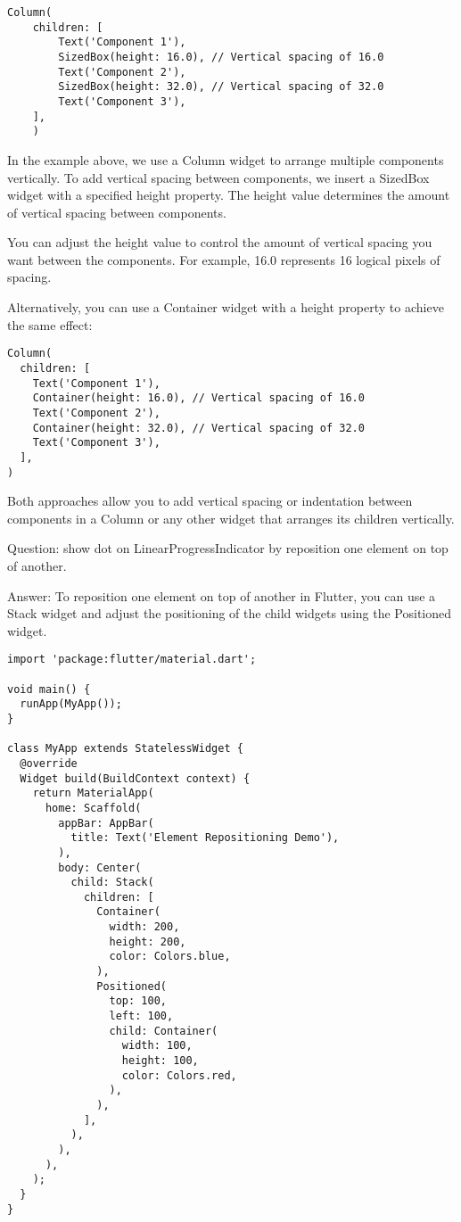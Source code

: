 \begin{lstlisting}
Column(
    children: [
        Text('Component 1'),
        SizedBox(height: 16.0), // Vertical spacing of 16.0
        Text('Component 2'),
        SizedBox(height: 32.0), // Vertical spacing of 32.0
        Text('Component 3'),
    ],
    ) 
\end{lstlisting}

In the example above, we use a Column widget to arrange multiple components vertically. To add vertical spacing 
between components, we insert a SizedBox widget with a specified height property. The height value determines 
the amount of vertical spacing between components.

You can adjust the height value to control the amount of vertical spacing you want between the components. 
For example, 16.0 represents 16 logical pixels of spacing.

Alternatively, you can use a Container widget with a height property to achieve the same effect:

\begin{lstlisting}
Column(
  children: [
    Text('Component 1'),
    Container(height: 16.0), // Vertical spacing of 16.0
    Text('Component 2'),
    Container(height: 32.0), // Vertical spacing of 32.0
    Text('Component 3'),
  ],
)
\end{lstlisting}

Both approaches allow you to add vertical spacing or indentation between components in a Column or any other 
widget that arranges its children vertically.


Question: show dot on LinearProgressIndicator by reposition one element on top of another.

Answer: To reposition one element on top of another in Flutter, you can use a Stack widget and adjust the 
positioning of the child widgets using the Positioned widget.

\begin{lstlisting}
import 'package:flutter/material.dart';

void main() {
  runApp(MyApp());
}

class MyApp extends StatelessWidget {
  @override
  Widget build(BuildContext context) {
    return MaterialApp(
      home: Scaffold(
        appBar: AppBar(
          title: Text('Element Repositioning Demo'),
        ),
        body: Center(
          child: Stack(
            children: [
              Container(
                width: 200,
                height: 200,
                color: Colors.blue,
              ),
              Positioned(
                top: 100,
                left: 100,
                child: Container(
                  width: 100,
                  height: 100,
                  color: Colors.red,
                ),
              ),
            ],
          ),
        ),
      ),
    );
  }
}
\end{lstlisting}

